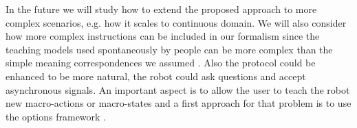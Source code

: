 %
In the future we will study how to extend the proposed approach to more complex scenarios, e.g. how it scales to continuous domain. We will also consider how more complex instructions can be included in our formalism since the teaching models used spontaneously by people can be more complex than the simple meaning correspondences we assumed \cite{Thomaz2008,Cakmak2010}. Also the protocol could be enhanced to be more natural, the robot could ask questions \cite{cakmak2012designing} and accept asynchronous signals. An important aspect is to allow the user to teach the robot new macro-actions or macro-states and a first approach for that problem is to use the options framework \cite{sutton1999between}.
%
%
